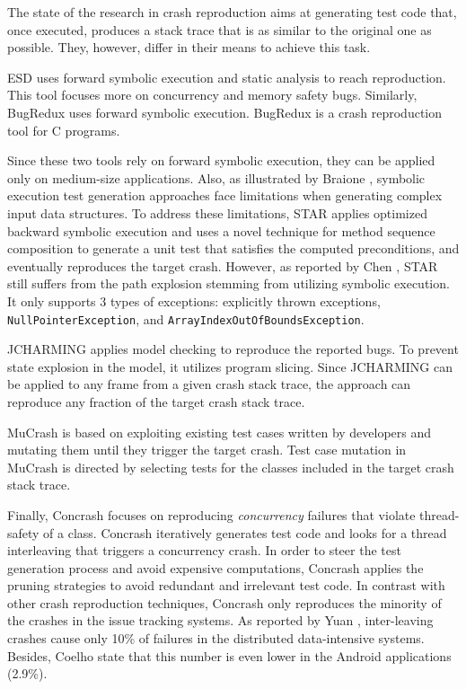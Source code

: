 The state of the research in crash reproduction \cite{Zamfir2010, jin2012bugredux, BPT17concrash, soltani2017, Nayrolles2017, Xuan2015, Chen2015} aims at generating test code that, once executed, produces a stack trace that is as similar to the original one as possible. They, however, differ in their means to achieve this task. 

\textrm{ESD} \cite{Zamfir2010} uses forward symbolic execution and static analysis to reach reproduction. This tool focuses more on concurrency and memory safety bugs.
Similarly, \textrm{BugRedux} \cite{jin2012bugredux} uses forward symbolic execution. \textrm{BugRedux} is a crash reproduction tool for C programs.

Since these two tools rely on forward symbolic execution, they can be applied only on medium-size applications. Also, as illustrated by Braione \etal \cite{braione2017tardis}, symbolic execution test generation approaches face limitations when generating complex input data structures.
To address these limitations, \textrm{STAR} \cite{Chen2015} applies optimized backward symbolic execution and uses a novel technique for method sequence composition to generate a unit test that satisfies the computed preconditions, and eventually reproduces the target crash. 
However, as reported by Chen \etal \cite{Chen2015}, \textrm{STAR} still suffers from the path explosion stemming from utilizing symbolic execution. 
It only supports 3 types of exceptions: explicitly thrown exceptions, \texttt{NullPointerException}, and \texttt{ArrayIndexOutOfBoundsException}.  

\textrm{JCHARMING} \cite{Nayrolles2017} applies model checking to reproduce the reported bugs. To prevent state explosion in the model, it utilizes program slicing.
Since \textrm{JCHARMING} can be applied to any frame from a given crash stack trace, the approach can reproduce any fraction of the target crash stack trace. 

\textrm{MuCrash} \cite{Xuan2015} is based on exploiting existing test cases written by developers and mutating them until they trigger the target crash.
Test case mutation in \textrm{MuCrash} is directed by selecting tests for the classes included in the target crash stack trace. 

Finally, \textrm{Concrash} \cite{BPT17concrash} focuses on reproducing \textit{concurrency} failures that violate thread-safety of a class.
\textrm{Concrash} iteratively generates test code and looks for a thread interleaving that triggers a concurrency crash.
In order to steer the test generation process and avoid expensive computations, \textrm{Concrash} applies the pruning strategies to avoid redundant and irrelevant test code. In contrast with other crash reproduction techniques, \textrm{Concrash} only reproduces the minority of the crashes in the issue tracking systems. As reported by Yuan \etal \cite{Yuan2014}, inter-leaving crashes cause only 10\% of failures in the distributed data-intensive systems. Besides, Coelho \etal \cite{Coelho2015} state that this number is even lower in the Android applications (2.9\%).

